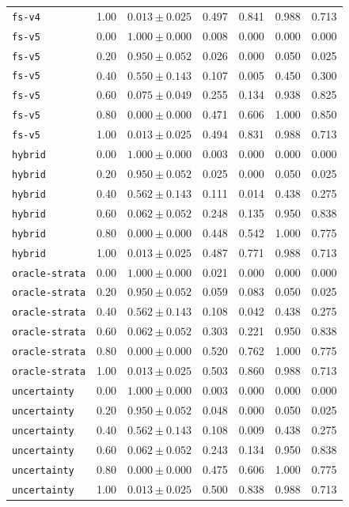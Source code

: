 \documentclass{article}
\begin{document}
\begin{center}
\begin{tabular}{llccccc}
\texttt{fs-v4} & 1.00 & $0.013 \pm 0.025$ & 0.497 & 0.841 & 0.988 & 0.713 \\
\texttt{fs-v5} & 0.00 & $1.000 \pm 0.000$ & 0.008 & 0.000 & 0.000 & 0.000 \\
\texttt{fs-v5} & 0.20 & $0.950 \pm 0.052$ & 0.026 & 0.000 & 0.050 & 0.025 \\
\texttt{fs-v5} & 0.40 & $0.550 \pm 0.143$ & 0.107 & 0.005 & 0.450 & 0.300 \\
\texttt{fs-v5} & 0.60 & $0.075 \pm 0.049$ & 0.255 & 0.134 & 0.938 & 0.825 \\
\texttt{fs-v5} & 0.80 & $0.000 \pm 0.000$ & 0.471 & 0.606 & 1.000 & 0.850 \\
\texttt{fs-v5} & 1.00 & $0.013 \pm 0.025$ & 0.494 & 0.831 & 0.988 & 0.713 \\
\texttt{hybrid} & 0.00 & $1.000 \pm 0.000$ & 0.003 & 0.000 & 0.000 & 0.000 \\
\texttt{hybrid} & 0.20 & $0.950 \pm 0.052$ & 0.025 & 0.000 & 0.050 & 0.025 \\
\texttt{hybrid} & 0.40 & $0.562 \pm 0.143$ & 0.111 & 0.014 & 0.438 & 0.275 \\
\texttt{hybrid} & 0.60 & $0.062 \pm 0.052$ & 0.248 & 0.135 & 0.950 & 0.838 \\
\texttt{hybrid} & 0.80 & $0.000 \pm 0.000$ & 0.448 & 0.542 & 1.000 & 0.775 \\
\texttt{hybrid} & 1.00 & $0.013 \pm 0.025$ & 0.487 & 0.771 & 0.988 & 0.713 \\
\texttt{oracle-strata} & 0.00 & $1.000 \pm 0.000$ & 0.021 & 0.000 & 0.000 & 0.000 \\
\texttt{oracle-strata} & 0.20 & $0.950 \pm 0.052$ & 0.059 & 0.083 & 0.050 & 0.025 \\
\texttt{oracle-strata} & 0.40 & $0.562 \pm 0.143$ & 0.108 & 0.042 & 0.438 & 0.275 \\
\texttt{oracle-strata} & 0.60 & $0.062 \pm 0.052$ & 0.303 & 0.221 & 0.950 & 0.838 \\
\texttt{oracle-strata} & 0.80 & $0.000 \pm 0.000$ & 0.520 & 0.762 & 1.000 & 0.775 \\
\texttt{oracle-strata} & 1.00 & $0.013 \pm 0.025$ & 0.503 & 0.860 & 0.988 & 0.713 \\
\texttt{uncertainty} & 0.00 & $1.000 \pm 0.000$ & 0.003 & 0.000 & 0.000 & 0.000 \\
\texttt{uncertainty} & 0.20 & $0.950 \pm 0.052$ & 0.048 & 0.000 & 0.050 & 0.025 \\
\texttt{uncertainty} & 0.40 & $0.562 \pm 0.143$ & 0.108 & 0.009 & 0.438 & 0.275 \\
\texttt{uncertainty} & 0.60 & $0.062 \pm 0.052$ & 0.243 & 0.134 & 0.950 & 0.838 \\
\texttt{uncertainty} & 0.80 & $0.000 \pm 0.000$ & 0.475 & 0.606 & 1.000 & 0.775 \\
\texttt{uncertainty} & 1.00 & $0.013 \pm 0.025$ & 0.500 & 0.838 & 0.988 & 0.713 \\
\bottomrule
\end{tabular}
\end{center}
\normalsize
\end{document}
